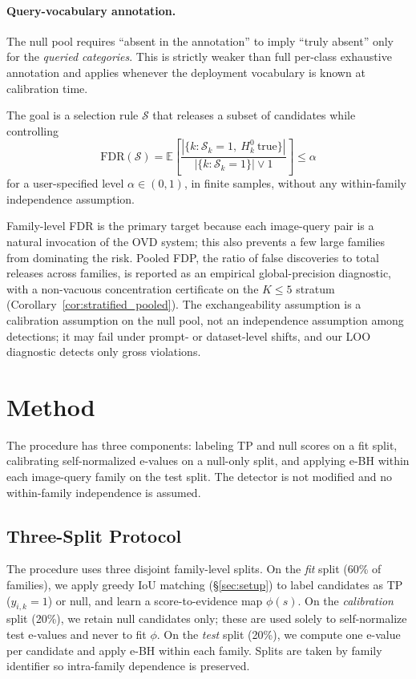 \documentclass{article}
\theoremstyle{remark}
\newcommand{\FDR}{\mathrm{FDR}}
\newcommand{\E}{\mathbb{E}}
\newcommand{\1}{\mathbf{1}}
\begin{document}
\paragraph{Query-vocabulary annotation.}
The null pool requires ``absent in the annotation'' to imply ``truly
absent'' only for the \emph{queried categories}. This is strictly
weaker than full per-class exhaustive annotation and applies
whenever the deployment vocabulary is known at calibration time.

The goal is a selection rule $\mathcal{S}$ that releases a subset of candidates while controlling
\begin{equation}
\FDR(\mathcal{S}) = \E\left[\frac{|\{k : \mathcal{S}_k=1,\ H_k^0\ \text{true}\}|}{|\{k : \mathcal{S}_k=1\}| \vee 1}\right]
\le \alpha
\end{equation}
for a user-specified level $\alpha \in (0,1)$, in finite samples, without any within-family independence assumption.

Family-level FDR is the primary target because each image-query
pair is a natural invocation of the OVD system; this also prevents
a few large families from dominating the risk. Pooled FDP, the
ratio of false discoveries to total releases across families, is
reported as an empirical global-precision diagnostic, with a
non-vacuous concentration certificate on the $K\!\le\!5$ stratum
(Corollary~\ref{cor:stratified_pooled}). The exchangeability
assumption is a calibration assumption on the null pool, not an
independence assumption among detections; it may fail under
prompt- or dataset-level shifts, and our LOO diagnostic detects
only gross violations.

\section{Method}
\label{sec:method}

The procedure has three components: labeling TP and null scores on
a fit split, calibrating self-normalized e-values on a null-only
split, and applying e-BH within each image-query family on the test
split. The detector is not modified and no within-family
independence is assumed.

\subsection{Three-Split Protocol}

The procedure uses three disjoint family-level splits. On the
\emph{fit} split (60\% of families), we apply greedy IoU matching
(\S\ref{sec:setup}) to label candidates as TP ($y_{i,k}\!=\!1$) or
null, and learn a score-to-evidence map $\phi(s)$. On the
\emph{calibration} split (20\%), we retain null candidates only;
these are used solely to self-normalize test e-values and never to
fit $\phi$. On the \emph{test} split (20\%), we compute one e-value
per candidate and apply e-BH within each family. Splits are taken
by family identifier so intra-family dependence is preserved.
\end{document}
